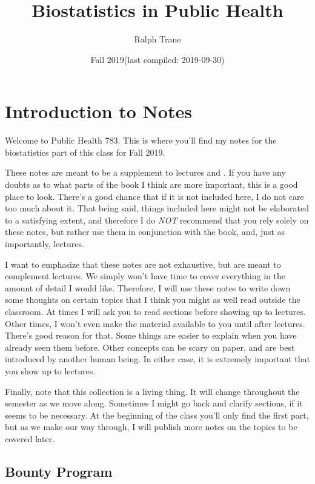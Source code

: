 \documentclass[]{book}
\title{Biostatistics in Public Health}
\author{Ralph Trane}
\date{Fall 2019(last compiled: 2019-09-30)}
\theoremstyle{definition}
\theoremstyle{definition}
\theoremstyle{definition}
\theoremstyle{remark}
\begin{document}
\maketitle

{
\setcounter{tocdepth}{1}
\tableofcontents
}
\hypertarget{introduction-to-notes}{%
\chapter{Introduction to Notes}\label{introduction-to-notes}}

\newcommand{\Var}{\text{Var}}
\newcommand{\var}{\text{var}}
\newcommand{\SD}{\text{SD}}

Welcome to Public Health 783. This is where you'll find my notes for the biostatistics part of this class for Fall 2019.

These notes are meant to be a supplement to lectures and \citet{ls}. If you have any doubts as to what parts of the book I think are more important, this is a good place to look. There's a good chance that if it is not included here, I do not care too much about it. That being said, things included here might not be elaborated to a satisfying extent, and therefore I do \emph{NOT} recommend that you rely solely on these notes, but rather use them in conjunction with the book, and, just as importantly, lectures.

I want to emphasize that these notes are not exhaustive, but are meant to complement lectures. We simply won't have time to cover everything in the amount of detail I would like. Therefore, I will use these notes to write down some thoughts on certain topics that I think you might as well read outside the classroom. At times I will ask you to read sections before showing up to lectures. Other times, I won't even make the material available to you until after lectures. There's good reason for that. Some things are easier to explain when you have already seen them before. Other concepts can be scary on paper, and are best introduced by another human being. In either case, it is extremely important that you show up to lectures.

Finally, note that this collection is a living thing. It will change throughout the semester as we move along. Sometimes I might go back and clarify sections, if it seems to be necessary. At the beginning of the class you'll only find the first part, but as we make our way through, I will publish more notes on the topics to be covered later.

\hypertarget{bounty-program}{%
\section*{Bounty Program}\label{bounty-program}}
\end{document}
